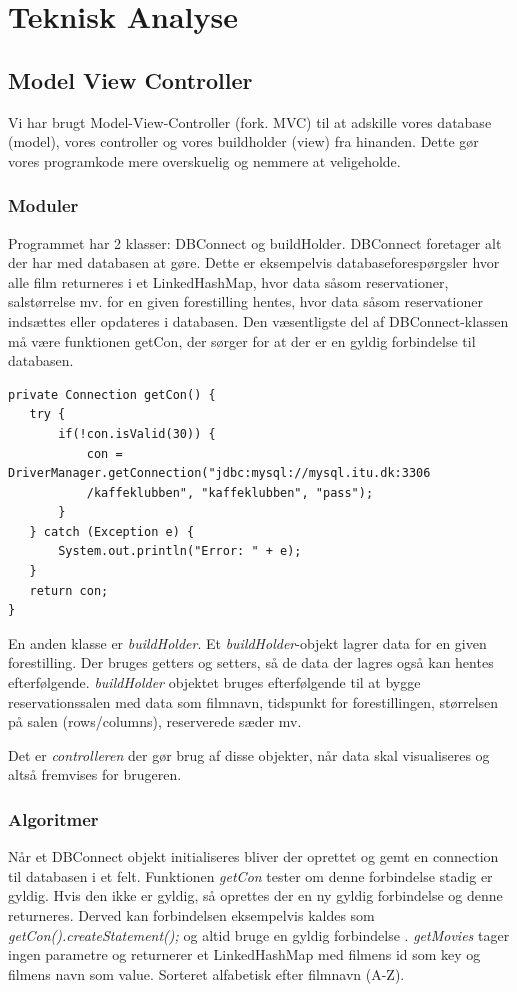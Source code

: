 \documentclass[final]{report}
\begin{document}
\chapter{Teknisk Analyse}
\section{Model View Controller}
Vi har brugt Model-View-Controller (fork. MVC) til at adskille vores database (model), vores controller og vores buildholder (view) fra hinanden. Dette gør vores programkode mere overskuelig og nemmere at veligeholde.

\subsection{Moduler}
Programmet har 2 klasser: DBConnect og buildHolder.
DBConnect foretager alt der har med databasen at gøre. Dette er eksempelvis databaseforespørgsler hvor alle film returneres i et LinkedHashMap, hvor data såsom reservationer, salstørrelse mv. for en given forestilling hentes, hvor data såsom reservationer indsættes eller opdateres i databasen. Den væsentligste del af DBConnect-klassen må være funktionen getCon, der sørger for at der er en gyldig forbindelse til databasen. 

\begin{verbatim}
private Connection getCon() {
   try {
       if(!con.isValid(30)) {
           con = DriverManager.getConnection("jdbc:mysql://mysql.itu.dk:3306
           /kaffeklubben", "kaffeklubben", "pass");
       }
   } catch (Exception e) {
       System.out.println("Error: " + e);
   }
   return con;
}
\end{verbatim}
\linebreak

En anden klasse er \emph{buildHolder}. Et \emph{buildHolder}-objekt lagrer data for en given forestilling. Der bruges getters og setters, så de data der lagres også kan hentes efterfølgende. \emph{buildHolder} objektet bruges efterfølgende til at bygge reservationssalen med data som filmnavn, tidspunkt for forestillingen, størrelsen på salen (rows/columns), reserverede sæder mv. 

Det er \emph{controlleren} der gør brug af disse objekter, når data skal visualiseres og altså fremvises for brugeren.

\subsection{Algoritmer}
Når et DBConnect objekt initialiseres bliver der oprettet og gemt en connection til databasen i et felt. Funktionen \emph{getCon} tester om denne forbindelse stadig er gyldig. Hvis den ikke er gyldig, så oprettes der en ny gyldig forbindelse og denne returneres. Derved kan forbindelsen eksempelvis kaldes som \emph{getCon().createStatement();} og altid bruge en gyldig forbindelse \cite{blueJ}. \emph{getMovies} tager ingen parametre og returnerer et LinkedHashMap med filmens id som key og filmens navn som value. Sorteret alfabetisk efter filmnavn (A-Z).
\end{document}
